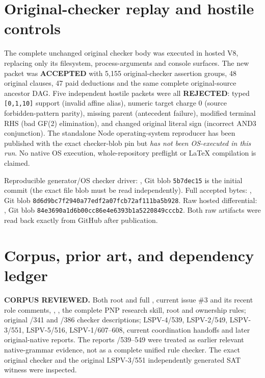 \documentclass[11pt]{article}
\begin{document}
\section*{Original-checker replay and hostile controls}
The complete unchanged original checker body was executed in hosted V8,
replacing only its filesystem, process-arguments and console surfaces.
The new packet was \textbf{ACCEPTED} with 5,155 original-checker
assertion groups, 48 original clauses, 47 paid deductions and the
same complete original-source ancestor DAG. Five independent hostile
packets were all \textbf{REJECTED}:
typed \texttt{[0,1,10]} support (invalid affine alias),
numeric target charge 0 (source forbidden-pattern parity),
missing parent (antecedent failure),
modified terminal RHS (bad GF(2) elimination), and changed original
literal sign (incorrect AND3 conjunction).
The standalone Node operating-system reproducer has been published
with the exact checker-blob pin but \emph{has not been OS-executed
in this run}. No native OS execution, whole-repository preflight
or LaTeX compilation is claimed.

Reproducible generator/OS checker driver:
,
Git blob \texttt{5b7dec15} is the initial commit (the exact file
blob must be read independently).
Full accepted bytes:
,
Git blob \texttt{8d6d9bc7f2940a77edf2a07fcb72af111ba5b928}.
Raw hosted differential:
,
Git blob \texttt{84e3690a1d6b00cc86e4e6393b1a5220849cccb2}.
Both raw artifacts were read back exactly from GitHub after publication.

\section*{Corpus, prior art, and dependency ledger}
\textbf{CORPUS REVIEWED.} Both root  and full
, current issue \#3 and its recent role comments,
, , the complete PNP research skill,
root  and ownership rules; original /341 and /386
checker descriptions; LSPV-4/539, LSPV-2/549, LSPV-3/551,
LSPV-5/516, LSPV-1/607--608, current coordination handoffs
and later original-native reports. The reports /539--549 were treated
as earlier relevant native-grammar evidence, not as a complete
unified rule checker. The exact original checker and the original
LSPV-3/551 independently generated SAT witness were inspected.
\end{document}
